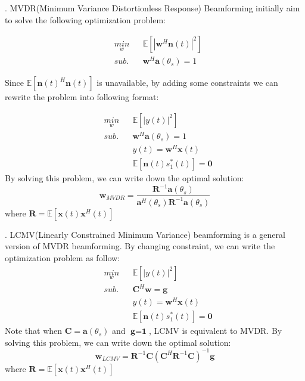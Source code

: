 \documentclass[11pt]{article}
\begin{document}
. MVDR(Minimum Variance Distortionless Response) Beamforming initially aim to solve the following optimization problem:

\begin{equation*}
\begin{aligned}
&\underset{w}{min} && \mathbb{E}[|\textbf{w}^H \textbf{n}(t)|^2] \\ &sub. &&\textbf{w}^H \textbf{a}(\theta_s) = 1
\end{aligned}
\end{equation*}

Since $\mathbb{E}[\textbf{n}(t)^H \textbf{n}(t)]$ is unavailable, by adding some constraints we can rewrite the problem into following format:

\begin{equation*}
\begin{aligned}
&\underset{w}{min} && \mathbb{E}[|y(t)|^2] \\ &sub. &&\textbf{w}^H \textbf{a}(\theta_s) = 1 \\ &&& y(t) = \textbf{w}^H \textbf{x}(t) \\ &&&\mathbb{E}[\textbf{n}(t) s_1^*(t)] = \textbf{0}
\end{aligned}
\end{equation*}
By solving this problem, we can write down the optimal solution:
$$\textbf{w}_{MVDR}= \frac{\textbf{R}^{-1} \textbf{a}(\theta_s)}{\textbf{a}^H(\theta_s)\textbf{R}^{-1} \textbf{a}(\theta_s)}$$
where $\textbf{R} = \mathbb{E}[\textbf{x}(t) \textbf{x}^H(t)]$\newline

. LCMV(Linearly Constrained Minimum Variance) beamforming is a general version of MVDR beamforming.
By changing constraint, we can write the optimization problem as follow:
\begin{equation*}
\begin{aligned}
&\underset{w}{min} && \mathbb{E}[|y(t)|^2] \\ &sub. &&\textbf{C}^H \textbf{w} = \textbf{g} \\ &&& y(t) = \textbf{w}^H \textbf{x}(t) \\ &&&\mathbb{E}[\textbf{n}(t) s_1^*(t)] = \textbf{0}
\end{aligned}
\end{equation*}
Note that when $\textbf{C} = \textbf{a}(\theta_s)$ and $\textbf{g} = \textbf{1}$, LCMV is equivalent to MVDR.
By solving this problem, we can write down the optimal solution:
$$\textbf{w}_{LCMV}= \textbf{R}^{-1} \textbf{C} (\textbf{C}^{H} \textbf{R}^{-1} \textbf{C})^{-1} \textbf{g}$$
where $\textbf{R} = \mathbb{E}[\textbf{x}(t) \textbf{x}^H(t)]$\newline
\end{document}
